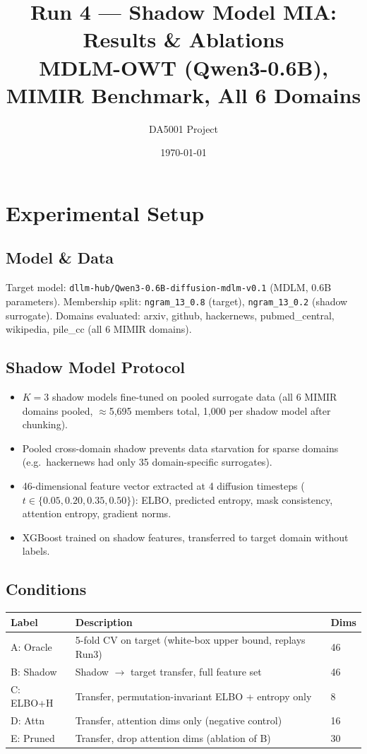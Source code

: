 \documentclass[11pt,a4paper]{article}
\title{Run 4 --- Shadow Model MIA: Results \& Ablations\\
\large MDLM-OWT (Qwen3-0.6B), MIMIR Benchmark, All 6 Domains}
\author{DA5001 Project}
\date{\today}
\begin{document}
\maketitle
\tableofcontents
\newpage

\section{Experimental Setup}

\subsection*{Model \& Data}
Target model: \texttt{dllm-hub/Qwen3-0.6B-diffusion-mdlm-v0.1} (MDLM, 0.6B parameters).
Membership split: \texttt{ngram\_13\_0.8} (target), \texttt{ngram\_13\_0.2} (shadow surrogate).
Domains evaluated: arxiv, github, hackernews, pubmed\_central, wikipedia, pile\_cc (all 6 MIMIR domains).

\subsection*{Shadow Model Protocol}
\begin{itemize}
  \item $K=3$ shadow models fine-tuned on pooled surrogate data (all 6 MIMIR domains pooled, $\approx$5{,}695 members total, 1{,}000 per shadow model after chunking).
  \item Pooled cross-domain shadow prevents data starvation for sparse domains (e.g.\ hackernews had only 35 domain-specific surrogates).
  \item 46-dimensional feature vector extracted at 4 diffusion timesteps ($t \in \{0.05, 0.20, 0.35, 0.50\}$): ELBO, predicted entropy, mask consistency, attention entropy, gradient norms.
  \item XGBoost trained on shadow features, transferred to target domain without labels.
\end{itemize}

\subsection*{Conditions}
\begin{center}
\begin{tabular}{lll}
\toprule
\textbf{Label} & \textbf{Description} & \textbf{Dims} \\
\midrule
A: Oracle   & 5-fold CV on target (white-box upper bound, replays Run3) & 46 \\
B: Shadow   & Shadow $\to$ target transfer, full feature set             & 46 \\
C: ELBO+H   & Transfer, permutation-invariant ELBO + entropy only        & 8  \\
D: Attn     & Transfer, attention dims only (negative control)           & 16 \\
E: Pruned   & Transfer, drop attention dims (ablation of B)              & 30 \\
\bottomrule
\end{tabular}
\end{center}
\end{document}

